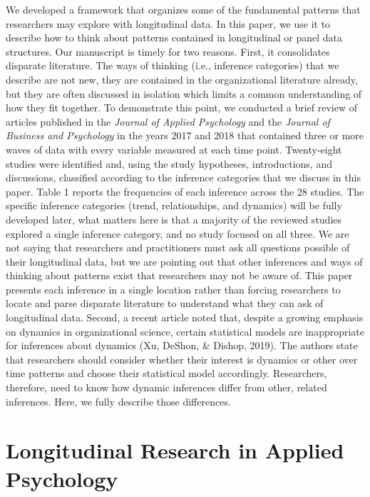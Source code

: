 \documentclass[english,,man]{apa6}
\begin{document}
We developed a framework that organizes some of the fundamental patterns that researchers may explore with longitudinal data. In this paper, we use it to describe how to think about patterns contained in longitudinal or panel data structures. Our manuscript is timely for two reasons. First, it consolidates disparate literature. The ways of thinking (i.e., inference categories) that we describe are not new, they are contained in the organizational literature already, but they are often discussed in isolation which limits a common understanding of how they fit together. To demonstrate this point, we conducted a brief review of articles published in the \emph{Journal of Applied Psychology} and the \emph{Journal of Business and Psychology} in the years 2017 and 2018 that contained three or more waves of data with every variable measured at each time point. Twenty-eight studies were identified and, using the study hypotheses, introductions, and discussions, classified according to the inference categories that we discuss in this paper. Table 1 reports the frequencies of each inference across the 28 studies. The specific inference categories (trend, relationships, and dynamics) will be fully developed later, what matters here is that a majority of the reviewed studies explored a single inference category, and no study focused on all three. We are not saying that researchers and practitioners must ask all questions possible of their longitudinal data, but we are pointing out that other inferences and ways of thinking about patterns exist that researchers may not be aware of. This paper presents each inference in a single location rather than forcing researchers to locate and parse disparate literature to understand what they can ask of longitudinal data. Second, a recent article noted that, despite a growing emphasis on dynamics in organizational science, certain statistical models are inappropriate for inferences about dynamics (Xu, DeShon, \& Dishop, 2019). The authors state that researchers should consider whether their interest is dynamics or other over time patterns and choose their statistical model accordingly. Researchers, therefore, need to know how dynamic inferences differ from other, related inferences. Here, we fully describe those differences.

\hypertarget{longitudinal-research-in-applied-psychology}{%
\section{Longitudinal Research in Applied Psychology}\label{longitudinal-research-in-applied-psychology}}
\end{document}
